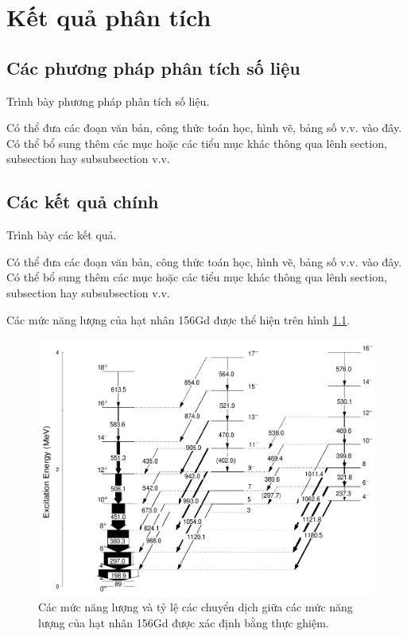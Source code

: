 \chapter{Kết quả phân tích}
\label{ch:ketquaphantich}

\section{Các phương pháp phân tích số liệu}

Trình bày phương pháp phân tích số liệu. 

Có thể đưa các đoạn văn bản, công thức toán học, hình vẽ, bảng số v.v. vào đây. Có thể bổ sung thêm các mục hoặc các tiểu mục khác thông qua lênh section, subsection hay subsubsection v.v.

\section{Các kết quả chính}
Trình bày các kết quả. 

Có thể đưa các đoạn văn bản, công thức toán học, hình vẽ, bảng số v.v. vào đây. Có thể bổ sung thêm các mục hoặc các tiểu mục khác thông qua lênh section, subsection hay subsubsection v.v.

Các mức năng lượng của hạt nhân 156Gd được thể hiện trên hình \ref{fig:156Gd}.

\begin{figure}[!h]
\centering
\includegraphics[width=0.4\paperwidth]{figure/fig_ketquaphantich/156Gd.png}
\caption{Các mức năng lượng và tỷ lệ các chuyển dịch giữa các mức năng lượng của hạt nhân 156Gd được xác định bằng thực ghiệm.}
\label{fig:156Gd}
\end{figure}